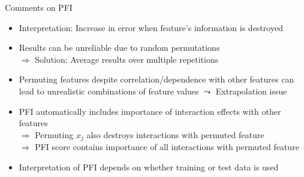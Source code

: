 \documentclass[11pt,compress,t,notes=noshow, aspectratio=169, xcolor=table]{beamer}
\begin{document}
\begin{frame}{Comments on PFI}
 \begin{itemize}[<+->]
 \itemsep1em
  \item Interpretation: Increase in error when feature's information is destroyed
  \item Results can be unreliable due to random permutations \\
  $\Rightarrow$ Solution: Average results over multiple repetitions
  \item Permuting features despite correlation/dependence with other features can lead to unrealistic combinations of feature values 
  $\leadsto$ Extrapolation issue %
  \item PFI automatically includes importance of interaction effects with other features \\
  $\Rightarrow$ Permuting $x_j$ also destroys interactions with permuted feature\\
  $\Rightarrow$ PFI score contains importance of all interactions with permuted feature %
  \item Interpretation of PFI depends on whether training or test data is used
 \end{itemize}
\end{frame}
\end{document}
